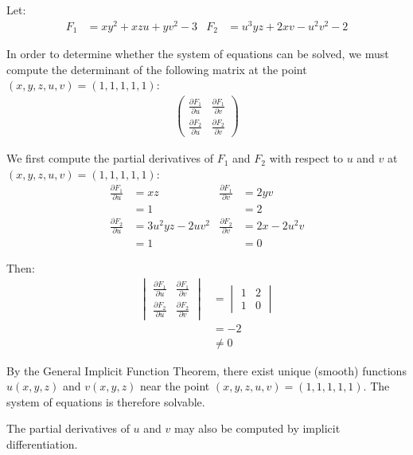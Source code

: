 \begin{solution}

Let:
\begin{align}
    F_1 &= xy^2 + xzu + yv^2 - 3 & F_2 &= u^3yz + 2xv - u^2v^2 - 2
\end{align}

In order to determine whether the system of equations can be solved, we must compute the determinant of the following matrix at the point \((x, y, z, u, v) = (1, 1, 1, 1, 1)\):
\begin{align}
    \begin{pmatrix}
        \frac{\partial F_1}{\partial u} & \frac{\partial F_1}{\partial v} \\
        \frac{\partial F_2}{\partial u} & \frac{\partial F_2}{\partial v}
    \end{pmatrix}
\end{align}

We first compute the partial derivatives of \(F_1\) and \(F_2\) with respect to \(u\) and \(v\) at \((x, y, z, u, v) = (1, 1, 1, 1, 1)\):
\begin{align}
    \frac{\partial F_1}{\partial u} &= xz & \frac{\partial F_1}{\partial v} &= 2yv \\
    &= 1 & &= 2 \\
    \frac{\partial F_2}{\partial u} &= 3u^2yz - 2uv^2 & \frac{\partial F_2}{\partial v} &= 2x - 2u^2v \\
    &= 1 & &= 0
\end{align}

Then:
\begin{align*}
    \begin{vmatrix}
        \frac{\partial F_1}{\partial u} & \frac{\partial F_1}{\partial v} \\
        \frac{\partial F_2}{\partial u} & \frac{\partial F_2}{\partial v}
    \end{vmatrix} &=
    \begin{vmatrix}
        1 & 2 \\
        1 & 0 
    \end{vmatrix} \\
    &= -2 \\
    &\neq 0
\end{align*}

By the General Implicit Function Theorem, there exist unique (smooth) functions \(u(x,y,z)\) and \(v(x,y,z)\) near the point \((x,y,z,u,v) = (1,1,1,1,1)\). The system of equations is therefore solvable.

The partial derivatives of \(u\) and \(v\) may also be computed by implicit differentiation.


\end{solution}
